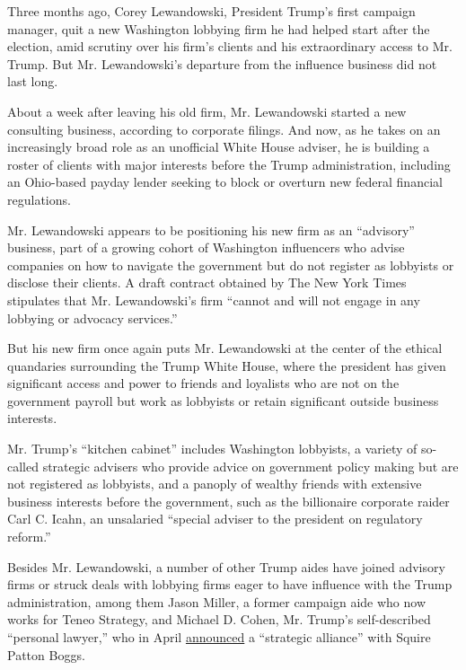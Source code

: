 Three months ago, Corey Lewandowski, President Trump's first campaign
manager, quit a new Washington lobbying firm he had helped start after
the election, amid scrutiny over his firm's clients and his
extraordinary access to Mr. Trump. But Mr. Lewandowski's departure from
the influence business did not last long.

About a week after leaving his old firm, Mr. Lewandowski started a new
consulting business, according to corporate filings. And now, as he
takes on an increasingly broad role as an unofficial White House
adviser, he is building a roster of clients with major interests before
the Trump administration, including an Ohio-based payday lender seeking
to block or overturn new federal financial regulations.

Mr. Lewandowski appears to be positioning his new firm as an
``advisory'' business, part of a growing cohort of Washington
influencers who advise companies on how to navigate the government but
do not register as lobbyists or disclose their clients. A draft contract
obtained by The New York Times stipulates that Mr. Lewandowski's firm
``cannot and will not engage in any lobbying or advocacy services.''

But his new firm once again puts Mr. Lewandowski at the center of the
ethical quandaries surrounding the Trump White House, where the
president has given significant access and power to friends and
loyalists who are not on the government payroll but work as lobbyists or
retain significant outside business interests.

Mr. Trump's ``kitchen cabinet'' includes Washington lobbyists, a variety
of so-called strategic advisers who provide advice on government policy
making but are not registered as lobbyists, and a panoply of wealthy
friends with extensive business interests before the government, such as
the billionaire corporate raider Carl C. Icahn, an unsalaried ``special
adviser to the president on regulatory reform.''

Besides Mr. Lewandowski, a number of other Trump aides have joined
advisory firms or struck deals with lobbying firms eager to have
influence with the Trump administration, among them Jason Miller, a
former campaign aide who now works for Teneo Strategy, and Michael D.
Cohen, Mr. Trump's self-described ``personal lawyer,'' who in April
\href{http://www.squirepattonboggs.com/en/news/2017/04/squire-patton-boggs-forms-strategic-alliance-with-michael-d-cohen-and-associates}{announced}
a ``strategic alliance'' with Squire Patton Boggs.

